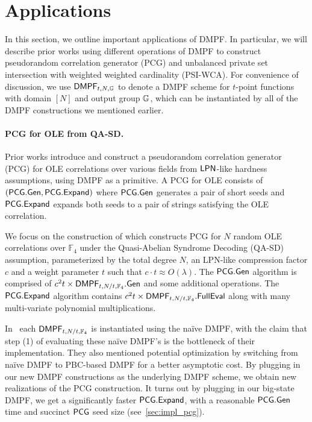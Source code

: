 \section{Applications}\label{sec:applications}
In this section, we outline important applications of DMPF. In particular, we will describe prior works using different operations of DMPF to construct pseudorandom correlation generator (PCG) and unbalanced private set intersection with weighted weighted cardinality (PSI-WCA). 
For convenience of discussion, we use ${\sf DMPF}_{t, N, \mathbb{G}}$ to denote a DMPF scheme for $t$-point functions with domain $[N]$ and output group $\mathbb{G}$, which can be instantiated by all of the DMPF constructions we mentioned earlier. 

\paragraph{PCG for OLE from QA-SD.}

Prior works \cite{cryptoeprint:2022/1035,foleage} introduce and construct a pseudorandom correlation generator (PCG) for OLE correlations over various fields from ${\sf LPN}$-like hardness assumptions, using DMPF as a primitive. A PCG for OLE  consists of $({\sf PCG}.{\sf Gen}, {\sf PCG}.{\sf Expand})$ where ${\sf PCG}.{\sf Gen}$ generates a pair of short seeds and ${\sf PCG}.{\sf Expand}$ expands both seeds to a pair of strings satisfying the OLE correlation. 

We focus on the construction of \cite{foleage} which constructs PCG for $N$ random OLE correlations over $\mathbb{F}_4$ under the Quasi-Abelian Syndrome Decoding (QA-SD) assumption, parameterized by the total degree $N$, an LPN-like compression factor $c$ and a weight parameter $t$ such that $c\cdot t\approx O(\lambda)$. The ${\sf PCG.Gen}$ algorithm is comprised of $c^2 t\times {\sf DMPF}_{t, N/t, \mathbb{F}_4}.{\sf Gen}$ and some additional operations.
The ${\sf PCG.Expand}$ algorithm contains $c^2t\times {\sf DMPF}_{t, N/t, \mathbb{F}_4}.{\sf FullEval}$ along with many multi-variate polynomial multiplications. 


In~\cite{foleage} each ${\sf DMPF}_{t, N/t, \mathbb{F}_4}$ is instantiated using the na\"ive DMPF, with the claim that step (1) of evaluating these na\"ive DMPF's is the bottleneck of their implementation. They also mentioned potential optimization by switching from na\"ive DMPF to PBC-based DMPF for a better asymptotic cost. 
By plugging in our new DMPF constructions as the underlying DMPF scheme, we obtain new realizations of the PCG construction. It turns out by plugging in our big-state DMPF, we get a significantly faster ${\sf PCG}.{\sf Expand}$, with a reasonable ${\sf PCG}.{\sf Gen}$ time and succinct ${\sf PCG}$ seed size (see~\cref{sec:impl_pcg}). 

